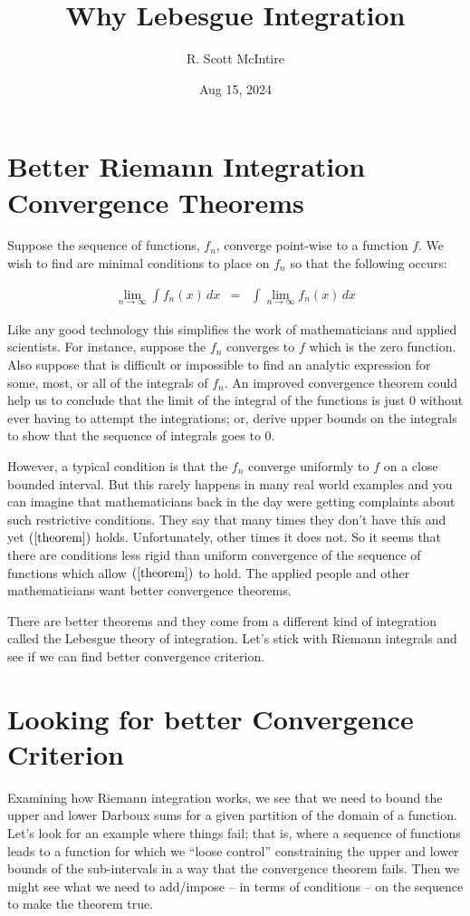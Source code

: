 \documentclass{article}
\title{Why Lebesgue Integration}
\author{R. Scott McIntire}
\date{Aug 15, 2024}
\begin{document}
\maketitle


\section{Better Riemann Integration Convergence Theorems}
Suppose the sequence of functions, $f_n$, converge point-wise to a function $f$.
We wish to find are minimal conditions to place on $f_n$ so that the following occurs:

\begin{eqnarray}
	\lim_{n \rightarrow \infty}\limits \int f_n(x) \, dx & = & \int \lim_{n \rightarrow \infty}\limits f_n(x) \, dx \label{theorem}
\end{eqnarray}

Like any good technology this simplifies the work of mathematicians 
and applied scientists. For instance, suppose the $f_n$ converges to $f$ 
which is the zero function. Also suppose that is difficult or impossible to 
find an analytic expression for some, most, or all of the integrals of $f_n$. 
An improved convergence theorem could help us to conclude that the limit of the integral of 
the functions is just $0$ without ever having to attempt the integrations; or, 
derive upper bounds on the integrals to show that 
the sequence of integrals goes to $0$.

However, a typical condition is that the $f_n$ converge 
uniformly to $f$ on a close bounded interval. 
But this rarely happens in many real world examples and you can imagine that
mathematicians back in the day
were getting complaints about such restrictive 
conditions. They say that many times they don't have this and yet $(\ref{theorem})$
holds. Unfortunately, other times it does not. So it seems that there are 
conditions less rigid than uniform convergence of the sequence of 
functions which allow $(\ref{theorem})$ to hold.
The applied people and other mathematicians want better convergence theorems.

There are better theorems and they come from a different kind of integration called 
the Lebesgue theory of integration.
Let's stick with Riemann integrals and see if we can find better convergence 
criterion.

\section{Looking for better Convergence Criterion}
Examining how Riemann integration works, we see that we need to bound the upper 
and lower Darboux sums for a given partition of the domain of a function. 
Let's look for an example where things fail; that is, where 
a sequence of functions leads to a function for which we ``loose control'' 
constraining the upper and lower bounds of the sub-intervals in a way that the 
convergence theorem fails. Then we might see what we need to add/impose 
-- in terms of conditions -- on the sequence to make the theorem true.
\end{document}
